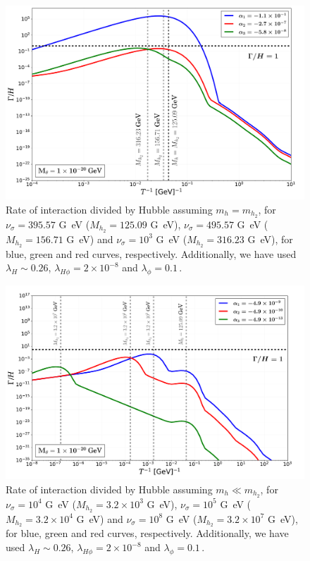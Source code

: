 \begin{figure}[H]
	\centering
	\includegraphics[width=0.75\linewidth]{graphs/ratedm_equal}
	\caption{Rate of interaction divided by Hubble assuming $m_h = m_{h_2}$, for $\nu_\sigma=395.57$ \si{G\eV} ($M_{h_2}=125.09$ \si{G\eV}),  $\nu_\sigma=495.57$ \si{G\eV} ($M_{h_2}=156.71$ \si{G\eV}) and  $\nu_\sigma=10^3$ \si{G\eV}  ($M_{h_2}=316.23$ \si{G\eV}), for blue, green and red curves, respectively.  Additionally, we have used $\lambda_H\sim0.26$, $\lambda_{H\phi}=2\times10^{-8}$ and $\lambda_\phi=0.1$\,.}
	\label{fig:rateequal}
\end{figure}

\begin{figure}[H]
	\centering
	\includegraphics[width=0.8\linewidth]{graphs/ratedm_greater}
	\caption{Rate of interaction divided by Hubble assuming $m_h \ll m_{h_2}$, for $\nu_\sigma=10^4$ \si{G\eV} ($M_{h_2} = 3.2\times10^{3}$ \si{G\eV}),  $\nu_\sigma=10^5$ \si{G\eV} ($M_{h_2} = 3.2\times10^{4}$ \si{G\eV}) and  $\nu_\sigma= 10^8$ \si{G\eV} ($M_{h_2} = 3.2\times10^{7}$ \si{G\eV}), for blue, green and red curves, respectively.  Additionally, we have used $\lambda_H\sim0.26$, $\lambda_{H\phi}=2\times10^{-8}$ and $\lambda_\phi=0.1$\,.}
	\label{fig:rategreater}
\end{figure}

